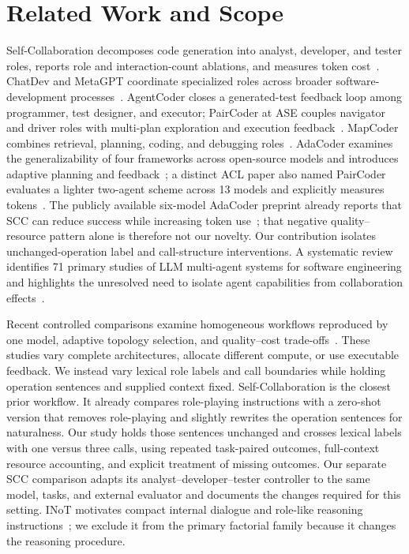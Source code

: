 \section{Related Work and Scope}
Self-Collaboration decomposes code generation into analyst, developer, and tester roles, reports role and interaction-count ablations, and measures token cost~\citep{dong2023selfcollaboration}. ChatDev and MetaGPT coordinate specialized roles across broader software-development processes~\citep{qian2024chatdev,hong2024metagpt}. AgentCoder closes a generated-test feedback loop among programmer, test designer, and executor; PairCoder at ASE couples navigator and driver roles with multi-plan exploration and execution feedback~\citep{huang2023agentcoder,zhang2024paircoder}. MapCoder combines retrieval, planning, coding, and debugging roles~\citep{islam2024mapcoder}. AdaCoder examines the generalizability of four frameworks across open-source models and introduces adaptive planning and feedback~\citep{zhu2025adacoderpreprint,zhu2026adacoder}; a distinct ACL paper also named PairCoder evaluates a lighter two-agent scheme across 13 models and explicitly measures tokens~\citep{chen2026paircoder}. The publicly available six-model AdaCoder preprint already reports that SCC can reduce success while increasing token use~\citep{zhu2025adacoderpreprint}; that negative quality--resource pattern alone is therefore not our novelty. Our contribution isolates unchanged-operation label and call-structure interventions. A systematic review identifies 71 primary studies of LLM multi-agent systems for software engineering and highlights the unresolved need to isolate agent capabilities from collaboration effects~\citep{he2025lma}.

Recent controlled comparisons examine homogeneous workflows reproduced by one model, adaptive topology selection, and quality--cost trade-offs~\citep{xu2026oneflow,hong2026dats,kapoor2025agents}. These studies vary complete architectures, allocate different compute, or use executable feedback. We instead vary lexical role labels and call boundaries while holding operation sentences and supplied context fixed. Self-Collaboration is the closest prior workflow. It already compares role-playing instructions with a zero-shot version that removes role-playing and slightly rewrites the operation sentences for naturalness. Our study holds those sentences unchanged and crosses lexical labels with one versus three calls, using repeated task-paired outcomes, full-context resource accounting, and explicit treatment of missing outcomes. Our separate SCC comparison adapts its analyst--developer--tester controller to the same model, tasks, and external evaluator and documents the changes required for this setting. INoT motivates compact internal dialogue and role-like reasoning instructions~\citep{sun2025inot}; we exclude it from the primary factorial family because it changes the reasoning procedure.

